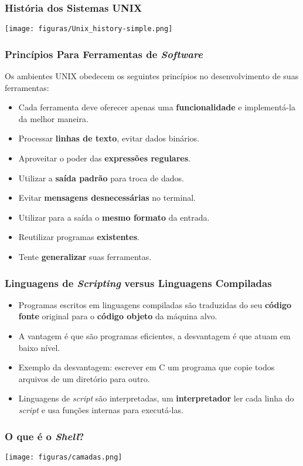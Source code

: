 \documentclass{beamer}
\begin{document}
\begin{frame}
   \frametitle{História dos Sistemas UNIX}
   \texttt{[image: figuras/Unix\_history-simple.png]}
\end{frame}

\begin{frame}
   \frametitle{Princípios Para Ferramentas de \textit{Software}}
   Os ambientes UNIX obedecem os seguintes princípios no desenvolvimento de suas ferramentas:
   \begin{itemize}
      \item Cada ferramenta deve oferecer apenas uma \textbf{funcionalidade} e implementá-la da melhor maneira.
      \item Processar \textbf{linhas de texto}, evitar dados binários.
      \item Aproveitar o poder das \textbf{expressões regulares}.
      \item Utilizar a \textbf{saída padrão} para troca de dados.
      \item Evitar \textbf{mensagens desnecessárias} no terminal.
      \item Utilizar para a saída o \textbf{mesmo formato} da entrada.
      \item Reutilizar programas \textbf{existentes}.
      \item Tente \textbf{generalizar} suas ferramentas.
   \end{itemize}
\end{frame}

\begin{frame}
   \frametitle{Linguagens de \textit{Scripting} versus Linguagens Compiladas}
   \begin{itemize}
      \item Programas escritos em linguagens compiladas são traduzidas do seu \textbf{código fonte} original para o \textbf{código objeto} da máquina alvo.
      \item A vantagem é que são programas eficientes, a desvantagem é que atuam em baixo nível.
      \item Exemplo da desvantagem: escrever em C um programa que copie todos arquivos de um diretório para outro.
      \item Linguagens de \textit{script} são interpretadas, um \textbf{interpretador} ler cada linha do \textit{script} e usa funções internas para executá-las.
   \end{itemize}
\end{frame}

\begin{frame}
   \frametitle{O que é o \textit{Shell}?}
   \centering
   \texttt{[image: figuras/camadas.png]}
\end{frame}
\end{document}
